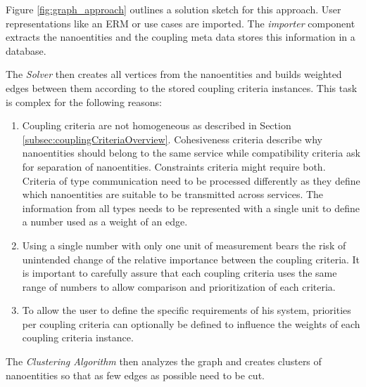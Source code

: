 \begin{minipage}[t]{0.5\textwidth}
	\setlength{\parskip}{5pt plus 0.1pt}
	
	
	Figure \ref{fig:graph_approach} outlines a solution sketch for this approach. User representations like an \gls{ERM} or use cases are imported. The \textit{importer} component extracts the nanoentities and the coupling meta data stores this information in a database.
	
	The \textit{Solver} then creates all vertices from the nanoentities and builds weighted edges between them according to the stored coupling criteria instances. This task is complex for the following reasons:
	
	\begin{enumerate}
		\item Coupling criteria are not homogeneous as described in Section \ref{subsec:couplingCriteriaOverview}. Cohesiveness criteria describe why nanoentities should belong to the same service while compatibility criteria ask for separation of nanoentities. Constraints criteria might require both. Criteria of type communication need to be processed differently as they define which nanoentities are suitable to be transmitted across services. The information from all types needs to be represented with a single unit to define a number used as a weight of an edge.
		
		\item Using a single number with only one unit of measurement bears the risk of unintended change of the relative importance between the coupling criteria. It is important to carefully assure that each coupling criteria uses the same range of numbers to allow comparison and prioritization of each criteria.   
		
		\item To allow the user to define the specific requirements of his system, priorities per coupling criteria can optionally be defined to influence the weights of each coupling criteria instance.
	\end{enumerate}
	
	The \textit{Clustering Algorithm} then analyzes the graph and creates clusters of nanoentities so that as few edges as possible need to be cut.	
	
\end{minipage}
